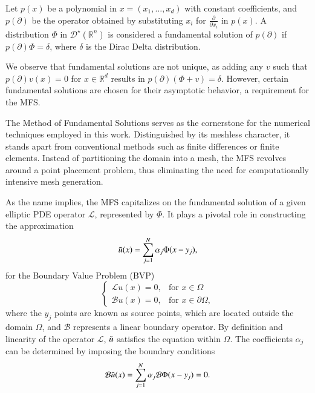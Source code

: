\documentclass[5p,authoryear]{elsarticle}
\begin{document}
Let $p(x)$ be a polynomial in $x=(x_1,\dots,x_d)$ with constant coefficients, and $p(\partial)$ be the operator obtained by substituting $x_i$ for $\frac{\partial}{\partial x_i}$ in $p(x)$. A distribution $\Phi$ in $\mathcal{D}^\star(\mathbb{R}^n)$ is considered a fundamental solution of $p(\partial)$ if $p(\partial) \Phi = \delta$, where $\delta$ is the Dirac Delta distribution.

We observe that fundamental solutions are not unique, as adding any $v$ such that $p(\partial) v(x) = 0$ for $x \in \mathbb{R}^d$ results in $p(\partial) (\Phi + v) = \delta$. However, certain fundamental solutions are chosen for their asymptotic behavior, a requirement for the MFS.

The Method of Fundamental Solutions serves as the cornerstone for the numerical techniques employed in this work. Distinguished by its meshless character, it stands apart from conventional methods such as finite differences or finite elements. Instead of partitioning the domain into a mesh, the MFS revolves around a point placement problem, thus eliminating the need for computationally intensive mesh generation.

As the name implies, the MFS capitalizes on the fundamental solution of a given elliptic PDE operator \(\mathcal{L}\), represented by $\Phi$. It plays a pivotal role in constructing the approximation
\begin{equation}\label{chapt_numerical_mfs_approx_intro}
    \Tilde{u}(x) = \sum_{j=1}^{N}\alpha_j \Phi(x-y_j),
\end{equation}
for the Boundary Value Problem (BVP)
\begin{equation}\label{general_elliptic_problem}
    \begin{cases}
        \mathcal{L}u(x) = 0, & \text{for } x \in \Omega\\
        \mathcal{B}u(x) = 0, & \text{for } x \in \partial\Omega,
    \end{cases}
\end{equation}
where the $y_j$ points are known as source points, which are located outside the domain \(\Omega\), and $\mathcal{B}$ represents a linear boundary operator. By definition and linearity of the operator $\mathcal{L}$, $\Tilde{u}$ satisfies the equation within $\Omega$. The coefficients $\alpha_j$ can be determined by imposing the boundary conditions
\[
\mathcal{B}\Tilde{u}(x) = \sum_{j=1}^{N}\alpha_j \mathcal{B}\Phi(x-y_j) = 0.
\]
\end{document}
